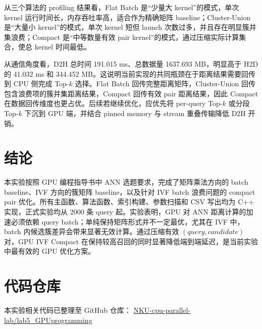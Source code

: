 \documentclass[a4paper]{article}
\begin{document}
从三个算法的 profiling 结果看，Flat Batch 是“少量大 kernel”的模式，单次 kernel 运行时间长，内存吞吐率高，适合作为精确矩阵 baseline；Cluster-Union 是“大量小 kernel”的模式，单次 kernel 短但 launch 次数过多，并且存在明显簇并集浪费；Compact 是“中等数量有效 pair kernel”的模式，通过压缩实际计算集合，使总 kernel 时间最低。

从通信角度看，D2H 总时间 191.015 ms、总数据量 1637.693 MB，明显高于 H2D 的 41.032 ms 和 344.452 MB。这说明当前实现的共同瓶颈在于距离结果需要回传到 CPU 侧完成 Top-$k$ 选择。Flat Batch 回传完整距离矩阵，Cluster-Union 回传包含浪费项的簇并集距离结果，Compact 回传有效 pair 距离结果，因此 Compact 在数据回传维度也更占优。后续若继续优化，应优先将 per-query Top-$k$ 或分段 Top-$k$ 下沉到 GPU 端，并结合 pinned memory 与 stream 重叠传输降低 D2H 开销。


\section{结论}

本实验按照 GPU 编程指导书中 ANN 选题要求，完成了矩阵乘法方向的 batch baseline、IVF 方向的簇矩阵 baseline，以及针对 IVF batch 浪费问题的 compact pair 优化。所有主函数、算法函数、索引构建、参数扫描和 CSV 写出均为 C++ 实现，正式实验均从 2000 条 query 起。实验表明，GPU 对 ANN 距离计算的加速必须依赖 query batch；单纯保持矩阵形式并不一定最优，尤其在 IVF 中，batch 内候选簇差异会带来显著无效计算。通过压缩有效 $(query,candidate)$ 对，GPU IVF Compact 在保持较高召回的同时显著降低端到端延迟，是当前实验中最有效的 GPU 优化方案。

\section*{代码仓库}

本实验相关代码已整理至 GitHub 仓库：
\href{https://github.com/liuyuze-121/NKU-cpu-parallel-lab/tree/main/lab5_GPUprogramming}{NKU-cpu-parallel-lab/lab5\_GPUprogramming}
\end{document}
